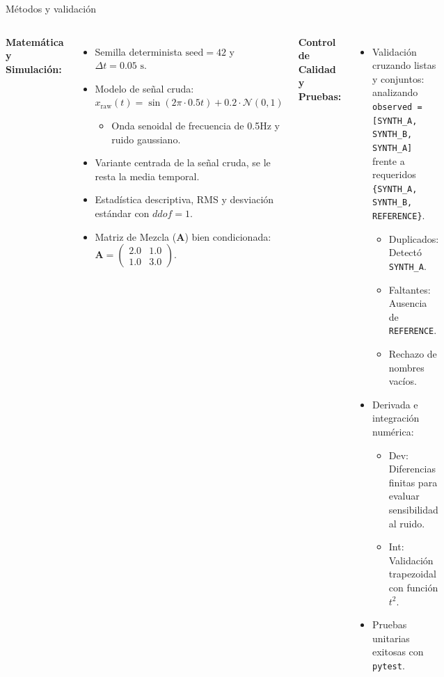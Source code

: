 \documentclass[aspectratio=169]{beamer}
\begin{document}
\begin{frame}{Métodos y validación}
    \begin{columns}[T]
        \textbf{Matemática y Simulación:}
        \begin{itemize}
            \small
            \item Semilla determinista $\text{seed} = 42$ y $\Delta t = 0.05\text{ s}$.
            \item Modelo de señal cruda: $x_{\text{raw}}(t) = \sin(2\pi \cdot 0.5 t) + 0.2 \cdot \mathcal{N}(0,1)$
            \begin{itemize}
                \tiny
                \item Onda senoidal de frecuencia de 0.5Hz y ruido gaussiano.
            \end{itemize}
            \item Variante centrada de la señal cruda, se le resta la media temporal.
            \item Estadística descriptiva, RMS y desviación estándar con $ddof=1$.
            \item Matriz de Mezcla ($\mathbf{A}$) bien condicionada:
            $\mathbf{A} = \begin{pmatrix} 2.0 & 1.0 \\ 1.0 & 3.0 \end{pmatrix}$.
        \end{itemize}
        
        \textbf{Control de Calidad y Pruebas:}
        \begin{itemize}
            \small
            \item Validación cruzando listas y conjuntos: analizando \texttt{observed = [SYNTH\_A, SYNTH\_B, SYNTH\_A]} frente a requeridos \texttt{\{SYNTH\_A, SYNTH\_B, REFERENCE\}}.
            \begin{itemize}
                \tiny
                \item Duplicados: Detectó \texttt{SYNTH\_A}.
                \item Faltantes: Ausencia de \texttt{REFERENCE}.
                \item Rechazo de nombres vacíos.
            \end{itemize}
            \item Derivada e integración numérica:
            \begin{itemize}
                \tiny
                \item Dev: Diferencias finitas para evaluar sensibilidad al ruido.
                \item Int: Validación trapezoidal con función $t^2$.
            \end{itemize}
            \item Pruebas unitarias exitosas con \texttt{pytest}.
        \end{itemize}
    \end{columns}
\end{frame}
\end{document}
